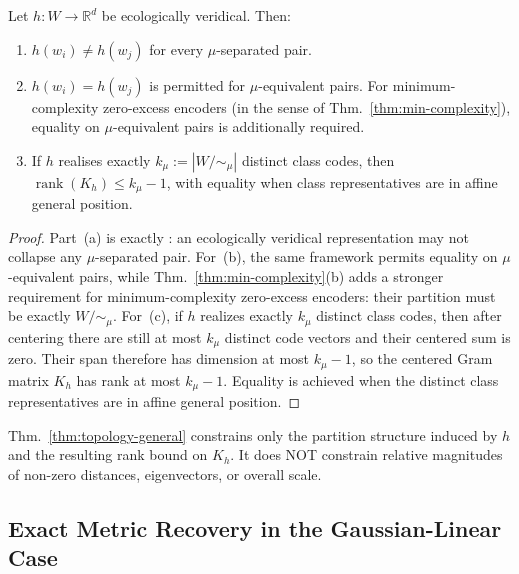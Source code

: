 \documentclass[twoside,11pt]{article}
\newcommand{\kmu}{k_\mu}
\newcommand{\rank}{\operatorname{rank}}
\newcommand{\R}{\mathbb{R}}
\newcommand{\thmref}[1]{Thm.~\ref{#1}}
\begin{document}
\begin{theorem}\label{thm:topology-general}
Let $h \colon W \to \R^d$ be ecologically veridical. Then:
\begin{enumerate}[label=(\alph*)]
\item $h(w_i) \neq h(w_j)$ for every $\mu$-separated pair.

\item $h(w_i) = h(w_j)$ is permitted for $\mu$-equivalent pairs. For minimum-complexity zero-excess encoders (in the sense of \thmref{thm:min-complexity}), equality on $\mu$-equivalent pairs is additionally required.

\item If $h$ realises exactly $\kmu := |W/{\sim_\mu}|$ distinct class codes, then $\rank(K_h) \le \kmu - 1$, with equality when class representatives are in affine general position.
\end{enumerate}
\end{theorem}

\begin{proof}
Part~(a) is exactly \citet[Theorem~4.1(a)]{dallariva_2026}: an ecologically veridical representation may not collapse any $\mu$-separated pair. For~(b), the same framework permits equality on $\mu$-equivalent pairs, while \thmref{thm:min-complexity}(b) adds a stronger requirement for minimum-complexity zero-excess encoders: their partition must be exactly $W/{\sim_\mu}$. For~(c), if $h$ realizes exactly $\kmu$ distinct class codes, then after centering there are still at most $\kmu$ distinct code vectors and their centered sum is zero. Their span therefore has dimension at most $\kmu-1$, so the centered Gram matrix $K_h$ has rank at most $\kmu-1$. Equality is achieved when the distinct class representatives are in affine general position.
\end{proof}

\begin{remark}
\thmref{thm:topology-general} constrains only the partition structure induced by $h$ and the resulting rank bound on $K_h$. It does NOT constrain relative magnitudes of non-zero distances, eigenvectors, or overall scale.
\end{remark}

\subsection{Exact Metric Recovery in the Gaussian-Linear Case}
\end{document}

